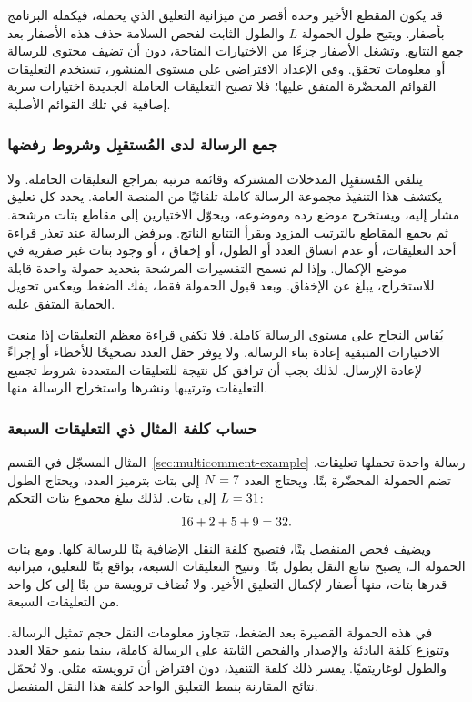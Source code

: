 قد يكون المقطع الأخير وحده أقصر من ميزانية التعليق الذي يحمله، فيكمله البرنامج بأصفار. ويتيح طول الحمولة $L$ والطول الثابت لفحص السلامة حذف هذه الأصفار بعد جمع التتابع. وتشغل الأصفار جزءًا من الاختيارات المتاحة، دون أن تضيف محتوى للرسالة أو معلومات تحقق. وفي الإعداد الافتراضي على مستوى المنشور، تستخدم التعليقات القوائم المحضّرة المتفق عليها؛ فلا تصبح التعليقات الحاملة الجديدة اختيارات سرية إضافية في تلك القوائم الأصلية.

\subsubsection{جمع الرسالة لدى المُستقبِل وشروط رفضها}
يتلقى المُستقبِل المدخلات المشتركة وقائمة مرتبة بمراجع التعليقات الحاملة. ولا يكتشف هذا التنفيذ مجموعة الرسالة كاملة تلقائيًا من المنصة العامة. يحدد كل تعليق مشار إليه، ويستخرج موضع رده وموضوعه، ويحوّل الاختيارين إلى مقاطع بتات مرشحة. ثم يجمع المقاطع بالترتيب المزود ويقرأ التتابع الناتج. ويرفض الرسالة عند تعذر قراءة أحد التعليقات، أو عدم اتساق العدد أو الطول، أو إخفاق ، أو وجود بتات غير صفرية في موضع الإكمال. وإذا لم تسمح التفسيرات المرشحة بتحديد حمولة واحدة قابلة للاستخراج، يبلغ عن الإخفاق. وبعد قبول الحمولة فقط، يفك الضغط ويعكس تحويل الحماية المتفق عليه.

يُقاس النجاح على مستوى الرسالة كاملة. فلا تكفي قراءة معظم التعليقات إذا منعت الاختيارات المتبقية إعادة بناء الرسالة. ولا يوفر حقل العدد تصحيحًا للأخطاء أو إجراءً لإعادة الإرسال. لذلك يجب أن ترافق كل نتيجة للتعليقات المتعددة شروط تجميع التعليقات وترتيبها ونشرها واستخراج الرسالة منها.

\subsubsection{حساب كلفة المثال ذي التعليقات السبعة}
المثال المسجّل في القسم~\ref{sec:multicomment-example} رسالة واحدة تحملها \NUM{\McCount} تعليقات. تضم الحمولة المحضّرة \NUM{\McCompressedBits} بتًا. ويحتاج العدد $N=7$ إلى \NUM{\McCountBits} بتات بترميز العدد، ويحتاج الطول $L=31$ إلى \NUM{\McLengthBits} بتات. لذلك يبلغ مجموع بتات التحكم:
\[
16+2+5+9=32.
\]
ويضيف فحص  المنفصل \NUM{\McIntegrityBits} بتًا، فتصبح كلفة النقل الإضافية  بتًا للرسالة كلها. ومع بتات الحمولة الـ\NUM{\McCompressedBits}، يصبح تتابع النقل بطول \NUM{\McStreamBits} بتًا. وتتيح التعليقات السبعة، بواقع \NUM{\McFrameBits} بتًا للتعليق، ميزانية قدرها \NUM{\McSlotBits} بتات، منها \NUM{\McPaddingBits} أصفار لإكمال التعليق الأخير. ولا تُضاف ترويسة من  بتًا إلى كل واحد من التعليقات السبعة.

في هذه الحمولة القصيرة بعد الضغط، تتجاوز معلومات النقل حجم تمثيل الرسالة. وتتوزع كلفة البادئة والإصدار والفحص الثابتة على الرسالة كاملة، بينما ينمو حقلا العدد والطول لوغاريتميًا. يفسر ذلك كلفة التنفيذ، دون افتراض أن ترويسته مثلى. ولا تُحمّل نتائج المقارنة بنمط التعليق الواحد كلفة هذا النقل المنفصل.
